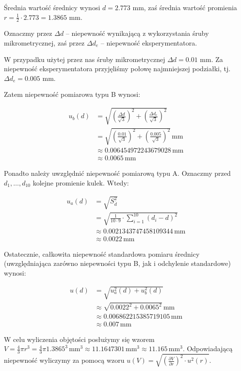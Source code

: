 \documentclass[a4paper]{article}
\begin{document}
Średnia wartość średnicy wynosi $d = 2.773$ mm, zaś średnia wartość promienia $r = \frac 1 2 \cdot 2.773 = 1.3865$ mm.

Oznaczmy przez $\Delta d$ -- niepewność wynikającą z wykorzystania śruby mikrometrycznej,
zaś przez $\Delta d_e$ -- niepewność eksperymentatora.

W przypadku użytej przez nas śruby mikrometrycznej $\Delta d = 0.01$ mm.
Za niepewność eksperymentatora przyjęliśmy połowę najmniejszej podziałki, tj. $\Delta d_e = 0.005$ mm.

Zatem niepewność pomiarowa typu B wynosi:

\begin{align*}
	u_b(d) &= \sqrt{\left(\frac{\Delta d}{\sqrt 3}\right)^2 + \left(\frac{\Delta d_e}{\sqrt 3}\right)^2} \\
	&= \sqrt{\left(\frac{0.01}{\sqrt 3}\right)^2 + \left(\frac{0.005}{\sqrt 3}\right)^2} \, \text{mm} \\
	&\approx 0.006454972243679028 \, \text{mm} \\
	&\approx 0.0065 \, \text{mm}
\end{align*}

Ponadto należy uwzględnić niepewność pomiarową typu A.
Oznaczmy przed $d_1, \dots, d_{10}$ kolejne promienie kulek.
Wtedy:

\begin{align*}
	u_a(d) &= \sqrt{S^{2}_{\overline{d}}} \\
	&= \sqrt{\frac{1}{10 \cdot 9} \cdot \sum_{i=1}^{10} (d_i - d)^2} \\
	&\approx 0.0021343747458109344 \, \text{mm} \\
	&\approx 0.0022 \, \text{mm}
\end{align*}

Ostatecznie, całkowita niepewność standardowa pomiaru średnicy (uwzględniająca zarówno niepewności typu B, jak i odchylenie standardowe) wynosi:

\begin{align*}
	u(d) &= \sqrt{u_a^2(d) + u_b^2(d)} \\
	&\approx \sqrt{0.0022^2 + 0.0065^2} \, \text{mm} \\
	&\approx 0.006862215385719105 \, \text{mm} \\
	&\approx 0.007 \, \text{mm}
\end{align*}

W celu wyliczenia objętości posłużymy się wzorem $V = \frac 4 3 \pi r^3 = \frac 4 3 \pi 1.3865^3 \, \text{mm}^3 \approx 11.1647301 \, \text{mm}^3 \approx 11.165 \, \text{mm}^3$.
Odpowiadającą niepewność wyliczymy za pomocą wzoru $u(V) = \sqrt{\left(\frac{\partial V}{\partial r}\right)^2 \cdot u^2(r)}$.
\end{document}
